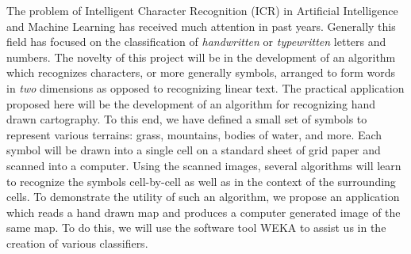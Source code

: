 
The problem of Intelligent Character Recognition (ICR) in Artificial
Intelligence and Machine Learning has received much attention in past years.
Generally this field has focused on the classification of \emph{handwritten}
or \emph{typewritten} letters and numbers.  The novelty of this project will be
in the development of an algorithm which recognizes characters, or more
generally symbols, arranged to form words in \emph{two} dimensions as opposed
to recognizing linear text. The practical application proposed here will be the
development of an algorithm for recognizing hand drawn cartography. To this
end, we have defined a small set of symbols to represent various terrains:
grass, mountains, bodies of water, and more. Each symbol will be drawn into a
single cell on a standard sheet of grid paper and scanned into a computer.
Using the scanned images, several algorithms will learn to recognize the
symbols cell-by-cell as well as in the context of the surrounding cells. To
demonstrate the utility of such an algorithm, we propose an application which
reads a hand drawn map and produces a computer generated image of the same map.
To do this, we will use the software tool WEKA\cite{hall2009} to assist us in
the creation of various classifiers.


